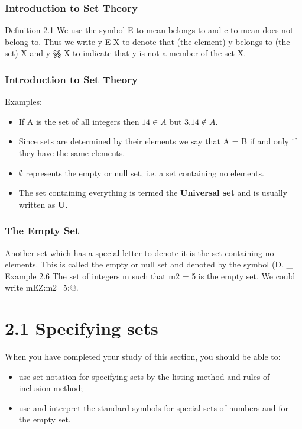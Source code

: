 \smallskip  %
\frametitle{Introduction to Set Theory}
\Large
Deﬁnition 2.1 
We use the symbol E to mean belongs to and ¢ to mean does not belong to.
Thus we write y E X to denote that (the element) y belongs to (the set) X and y §§ X to indicate
that y is not a member of the set X.
\smallskip  %
\frametitle{Introduction to Set Theory}
\Large
Examples:

\begin{itemize}
\item If A is the set of all integers then $14 \in A$ but $3.14 \notin A.$
\item Since sets are determined by their elements we say that A = B if and only
if they have the same elements.

\item $\emptyset$ represents the empty or null set, i.e. a set containing no elements.
\item The set containing everything is termed the \textbf{Universal set} and is usually
written as \textbf{U}.
\end{itemize}
\smallskip 
\smallskip 

\frametitle{The Empty Set}

Another set which has a special letter to denote it is the set containing no elements. This is called
the empty or null set and denoted by the symbol (D. _
Example 2.6 The set of integers m such that m2 = 5 is the empty set. We could write
{mEZ:m2=5}:@.
\smallskip 

\section{2.1 Specifying sets}
\smallskip 
When you have completed your study of this section, you should be able to:
\begin{itemize}
\item use set notation for specifying sets by the listing method and rules of inclusion method;
\item use and interpret the standard symbols for special sets of numbers and for the empty set.
\end{itemize}

